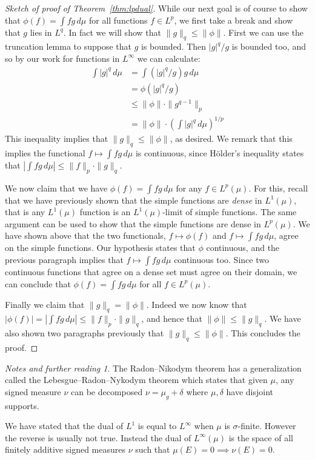 \documentclass[11pt,oneside]{amsbook}
\theoremstyle{definition}
\theoremstyle{plain}
\theoremstyle{definition}
\theoremstyle{remark}
\newtheorem*{notes}{Notes and further reading}
\numberwithin{equation}{section}
\numberwithin{figure}{section}
\begin{document}
\begin{proof}[Sketch of proof of Theorem~\ref{thm:lpdual}]
  While our next goal is of course to show that $\phi(f)=\int fg\,d\mu$ for all functions $f\in L^p$, we first take a break and show that $g$ lies in $L^q$. In fact we will show that $\|g\|_q\leq\|\phi\|$. First we can use the truncation lemma to suppose that $g$ is bounded. Then $|g|^q/g$ is bounded too, and so by our work for functions in $L^\infty$ we can calculate:
  \begin{align*}
    \int|g|^q\,d\mu&=\int(|g|^q/g)g\,d\mu\\
                   &=\phi(|g|^q/g)\\
                   &\leq\|\phi\|\cdot\|g^{q-1}\|_p\\
                   &=\|\phi\|\cdot\left(\int|g|^q\,d\mu\right)^{1/p}
  \end{align*}
  This inequality implies that $\|g\|_q\leq\|\phi\|$, as desired. We remark that this implies the functional $f\mapsto\int fg\,d\mu$ is continuous, since H\"older's inequality states that $\left|\int fg\,d\mu\right|\leq\|f\|_p\cdot\|g\|_q$.

  We now claim that we have $\phi(f)=\int fg\,d\mu$ for any $f\in L^p(\mu)$. For this, recall that we have previously shown that the simple functions are \emph{dense} in $L^1(\mu)$, that is any $L^1(\mu)$ function is an $L^1(\mu)$-limit of simple functions. The same argument can be used to show that the simple functions are dense in $L^p(\mu)$. We have shown above that the two functionals, $f\mapsto\phi(f)$ and $f\mapsto\int fg\,d\mu$, agree on the simple functions. Our hypothesis states that $\phi$ continuous, and the previous paragraph implies that $f\mapsto\int fg\,d\mu$ continuous too. Since two continuous functions that agree on a dense set must agree on their domain, we can conclude that $\phi(f)=\int fg\,d\mu$ for all $f\in L^p(\mu)$.

  Finally we claim that $\|g\|_q=\|\phi\|$. Indeed we now know that $|\phi(f)|=\left|\int fg\,d\mu\right|\leq\|f\|_p\cdot\|g\|_q$, and hence that $\|\phi\|\leq\|g\|_q$. We have also shown two paragraphs previously that $\|g\|_q\leq\|\phi\|$. This concludes the proof.
\end{proof}

\begin{notes}
  The Radon--Nikodym theorem has a generalization called the Lebesgue--Radon--Nykodym theorem which states that given $\mu$, any signed measure $\nu$ can be decomposed $\nu=\mu_g+\delta$ where $\mu,\delta$ have disjoint supports.

  We have stated that the dual of $L^1$ is equal to $L^\infty$ when $\mu$ is $\sigma$-finite. However the reverse is usually not true. Instead the dual of $L^\infty(\mu)$ is the space of all finitely additive signed measures $\nu$ such that $\mu(E)=0\implies\nu(E)=0$.
\end{notes}
\end{document}
